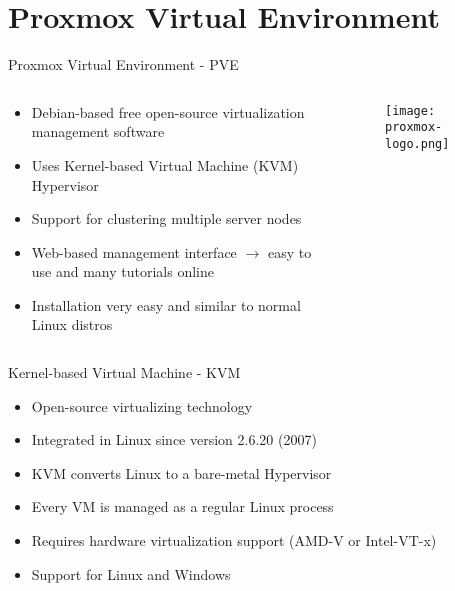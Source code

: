 \section{Proxmox Virtual Environment}

\begin{frame}[allowframebreaks]{Proxmox Virtual Environment - PVE}
    \begin{columns}
        \begin{column}{0.6\linewidth}
            \begin{itemize}
                \item Debian-based free open-source virtualization management software
                \item Uses Kernel-based Virtual Machine (KVM) Hypervisor
                \item Support for clustering multiple server nodes
                \item Web-based management interface $\rightarrow$ easy to use and many tutorials online
                \item Installation very easy and similar to normal Linux distros
            \end{itemize}
        \end{column}
        \begin{column}{0.4\linewidth}
            \begin{figure}
                \centering
                \texttt{[image: proxmox-logo.png]}\\
                \cite{proxmox_logo}
            \end{figure}
        \end{column}
    \end{columns}
\end{frame}


\begin{frame}{Kernel-based Virtual Machine - KVM}
    \begin{itemize}
        \item Open-source virtualizing technology
        \item Integrated in Linux since version 2.6.20 (2007)
        \item KVM converts Linux to a bare-metal Hypervisor
        \item Every VM is managed as a regular Linux process
        \item Requires hardware virtualization support (AMD-V or Intel-VT-x)
        \item Support for Linux and Windows
    \end{itemize}
\end{frame}

